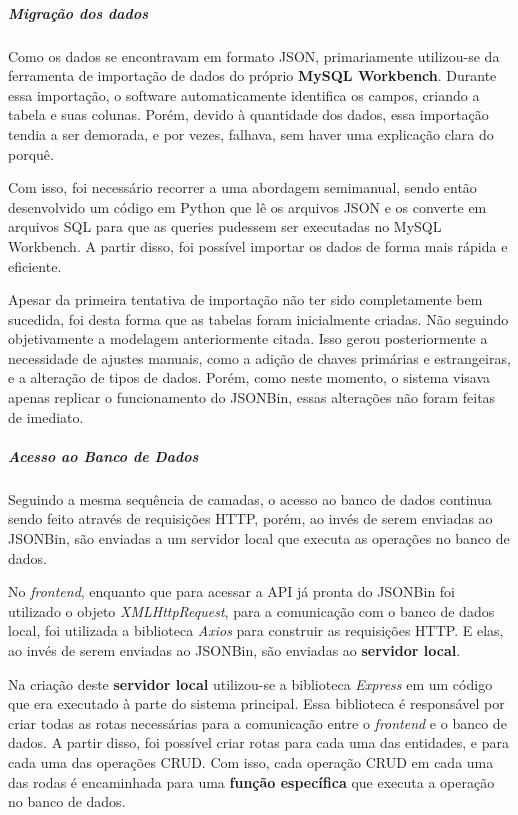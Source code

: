 \subparagraph*{Migração dos dados}

Como os dados se encontravam em formato JSON, primariamente utilizou-se da ferramenta de importação de dados do próprio \textbf{MySQL Workbench}. Durante essa importação, o software automaticamente identifica os campos, criando a tabela e suas colunas. Porém, devido à quantidade dos dados, essa importação tendia a ser demorada, e por vezes, falhava, sem haver uma explicação clara do porquê.

Com isso, foi necessário recorrer a uma abordagem semimanual, sendo então desenvolvido um código em Python que lê os arquivos JSON e os converte em arquivos SQL para que as queries pudessem ser executadas no MySQL Workbench. A partir disso, foi possível importar os dados de forma mais rápida e eficiente.

Apesar da primeira tentativa de importação não ter sido completamente bem sucedida, foi desta forma que as tabelas foram inicialmente criadas. Não seguindo objetivamente a modelagem anteriormente citada. Isso gerou posteriormente a necessidade de ajustes manuais, como a adição de chaves primárias e estrangeiras, e a alteração de tipos de dados. Porém, como neste momento, o sistema visava apenas replicar o funcionamento do JSONBin, essas alterações não foram feitas de imediato.


\subparagraph*{Acesso ao Banco de Dados}

Seguindo a mesma sequência de camadas, o acesso ao banco de dados continua sendo feito através de requisições HTTP, porém, ao invés de serem enviadas ao JSONBin, são enviadas a um servidor local que executa as operações no banco de dados.

No \textit{frontend}, enquanto que para acessar a API já pronta do JSONBin foi utilizado o objeto \textit{XMLHttpRequest}, para a comunicação com o banco de dados local, foi utilizada a biblioteca \textit{Axios} para construir as requisições HTTP. E elas, ao invés de serem enviadas ao JSONBin, são enviadas ao \textbf{servidor local}.

Na criação deste \textbf{servidor local} utilizou-se a biblioteca \textit{Express} em um código que era executado à parte do sistema principal. Essa biblioteca é responsável por criar todas as rotas necessárias para a comunicação entre o \textit{frontend} e o banco de dados. A partir disso, foi possível criar rotas para cada uma das entidades, e para cada uma das operações CRUD. Com isso, cada operação CRUD em cada uma das rodas é encaminhada para uma \textbf{função específica} que executa a operação no banco de dados.

